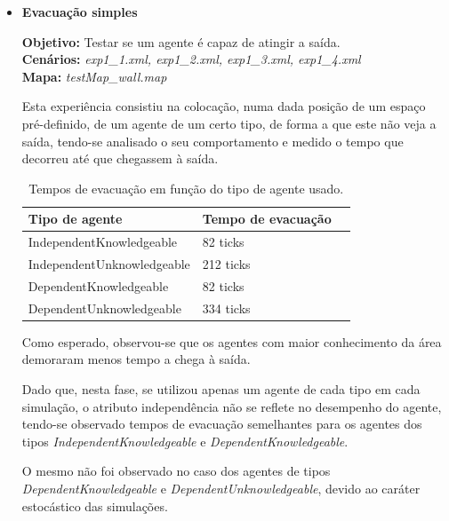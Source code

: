 \documentclass[12pt]{article}
\begin{document}
\begin{titlepage}
\begin{itemize}
	
\item \textbf{Evacuação simples}

\textbf{Objetivo:} 
                                                                                                                                  	Testar se um agente é capaz de atingir a saída.
\\\textbf{Cenários:} 
\textit{exp1\_1.xml, exp1\_2.xml, exp1\_3.xml, exp1\_4.xml}
\\\textbf{Mapa:} 
\textit{testMap\_wall.map}
	
Esta experiência consistiu na colocação, numa dada posição de um espaço pré-definido, de um agente de um certo tipo, de forma a que este não veja a saída, tendo-se analisado o seu comportamento e medido o tempo que decorreu até que chegassem à saída.

	
\setlength{\tabcolsep}{20pt}
\renewcommand{\arraystretch}{1.3}
\begin{table}[H]
	\centering
	\caption{Tempos de evacuação em função do tipo de agente usado.}
	\begin{tabular}{@{}lll@{}}
		\toprule
		\rowcolor[HTML]{FFFFFF} 
		\textbf{Tipo de agente}  & \textbf{Tempo de evacuação}\\
		\toprule
		\rowcolor[HTML]{FFFFFF} 
		IndependentKnowledgeable & 82 ticks \\ \midrule 
		\rowcolor[HTML]{FFFFFF} 
		IndependentUnknowledgeable & 212 ticks \\ \midrule 
		DependentKnowledgeable & 82 ticks \\ \midrule 
		DependentUnknowledgeable &
		334 ticks \\ \midrule 
	\end{tabular}
\end{table}
	
	Como esperado, observou-se que os agentes com maior conhecimento da área demoraram menos tempo a chega à saída.
	
	Dado que, nesta fase, se utilizou apenas um agente de cada tipo em cada simulação, o atributo independência não se reflete no desempenho do agente, tendo-se observado tempos de evacuação semelhantes para os agentes dos tipos \textit{IndependentKnowledgeable} e \textit{DependentKnowledgeable}. 
	
	O mesmo não foi observado no caso dos agentes de tipos \textit{DependentKnowledgeable} e \textit{DependentUnknowledgeable}, devido ao caráter estocástico das simulações.\newline


\end{itemize}
\end{titlepage}
\end{document}
